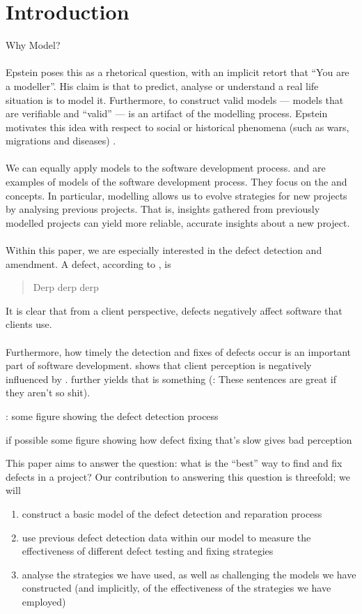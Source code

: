 \section{Introduction}

Why Model?\\
\\
Epstein poses this as a rhetorical question, with an implicit retort that “You are a modeller”. His claim is that to predict, analyse or understand a real life situation is to model it. Furthermore, to construct valid models --- models that are verifiable and “valid” --- is an artifact of the modelling process. Epstein motivates this idea with respect to social or historical phenomena (such as wars, migrations and diseases) \FIXME.\\
\\
We can equally apply models to the software development process. \FIXME and \FIXME are examples of models of the software development process. They focus on the \FIXME and \FIXME concepts. In particular, modelling allows us to evolve strategies for new projects by analysing previous projects. That is, insights gathered from previously modelled projects can yield more reliable, accurate insights about a new project.\\
\\
Within this paper, we are especially interested in the defect detection and amendment. A defect, according to \FIXME, is
\begin{quote}
  Derp derp derp
\end{quote}
It is clear that from a client perspective, defects negatively affect software that clients use. \\
\\
Furthermore, how timely the detection and fixes of defects occur is an important part of software development. \FIXME shows that client perception is negatively influenced by \FIXME. \FIXME further yields that \FIXME is something (\FIXME: These sentences are great if they aren’t so shit).

\FIXME: some figure showing the defect detection process

\FIXME if possible some figure showing how defect fixing that’s slow gives bad perception

This paper aims to answer the question: what is the ``best” way to find and fix defects in a project? Our contribution to answering this question is threefold; we will
\begin{enumerate}
  \item construct a basic model of the defect detection and reparation process
  \item use previous defect detection data within our model to measure the effectiveness of different defect testing and fixing strategies
  \item analyse the strategies we have used, as well as challenging the models we have constructed (and implicitly, of the effectiveness of the strategies we have employed)
\end{enumerate}
